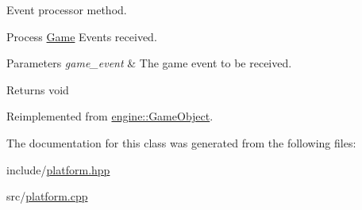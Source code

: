 Event processor method. 

Process \hyperlink{class_game}{Game} Events received.


\begin{DoxyParams}{Parameters}
{\em game\+\_\+event} & The game event to be received.\\
\hline
\end{DoxyParams}
\begin{DoxyReturn}{Returns}
void 
\end{DoxyReturn}


Reimplemented from \hyperlink{classengine_1_1_game_object}{engine\+::\+Game\+Object}.



The documentation for this class was generated from the following files\+:\begin{DoxyCompactItemize}
\item 
include/\hyperlink{platform_8hpp}{platform.\+hpp}\item 
src/\hyperlink{platform_8cpp}{platform.\+cpp}\end{DoxyCompactItemize}
